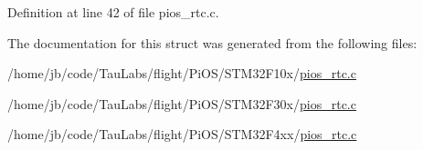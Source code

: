 \-Definition at line 42 of file pios\-\_\-rtc.\-c.



\-The documentation for this struct was generated from the following files\-:\begin{DoxyCompactItemize}
\item 
/home/jb/code/\-Tau\-Labs/flight/\-Pi\-O\-S/\-S\-T\-M32\-F10x/\hyperlink{_s_t_m32_f10x_2pios__rtc_8c}{pios\-\_\-rtc.\-c}\item 
/home/jb/code/\-Tau\-Labs/flight/\-Pi\-O\-S/\-S\-T\-M32\-F30x/\hyperlink{_s_t_m32_f30x_2pios__rtc_8c}{pios\-\_\-rtc.\-c}\item 
/home/jb/code/\-Tau\-Labs/flight/\-Pi\-O\-S/\-S\-T\-M32\-F4xx/\hyperlink{_s_t_m32_f4xx_2pios__rtc_8c}{pios\-\_\-rtc.\-c}\end{DoxyCompactItemize}
